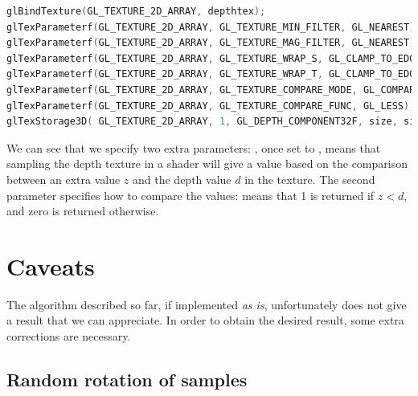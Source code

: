 \begin{lstlisting}[language=C++,label=lst:textureconfshadow,caption={Configuration of a shadow map depth texture.}]
glBindTexture(GL_TEXTURE_2D_ARRAY, depthtex);
glTexParameterf(GL_TEXTURE_2D_ARRAY, GL_TEXTURE_MIN_FILTER, GL_NEAREST);
glTexParameterf(GL_TEXTURE_2D_ARRAY, GL_TEXTURE_MAG_FILTER, GL_NEAREST);
glTexParameterf(GL_TEXTURE_2D_ARRAY, GL_TEXTURE_WRAP_S, GL_CLAMP_TO_EDGE);
glTexParameterf(GL_TEXTURE_2D_ARRAY, GL_TEXTURE_WRAP_T, GL_CLAMP_TO_EDGE);
glTexParameterf(GL_TEXTURE_2D_ARRAY, GL_TEXTURE_COMPARE_MODE, GL_COMPARE_REF_TO_TEXTURE);
glTexParameterf(GL_TEXTURE_2D_ARRAY, GL_TEXTURE_COMPARE_FUNC, GL_LESS);
glTexStorage3D(	GL_TEXTURE_2D_ARRAY, 1, GL_DEPTH_COMPONENT32F, size, size, layers);
\end{lstlisting}

We can see that we specify two extra parameters: , once set to , means that sampling the depth texture in a shader will give a value based on the comparison between an extra value $z$ and the depth value $d$ in the texture. The second parameter  specifies how to compare the values:  means that 1 is returned if $z<d$, and zero is returned otherwise. 

\section{Caveats}
The algorithm described so far, if implemented \emph{as is}, unfortunately does not give a result that we can appreciate. In order to obtain the desired result, some extra corrections are necessary.

\subsection{Random rotation of samples}

